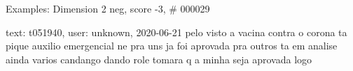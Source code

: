 \begin{frame}{Examples: Dimension 2 neg, score -3, \# 000029}
\footnotesize
\begin{alertblock}{text: t051940, user: unknown, 2020-06-21}
pelo visto a vacina contra o corona ta pique auxilio emergencial ne pra uns ja 
foi aprovada pra outros ta em analise ainda varios candango dando role 
\textbf{} tomara q a minha seja aprovada logo 
  
\end{alertblock}
\end{frame}
